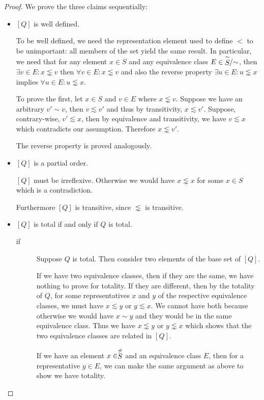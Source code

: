 \documentclass[12pt]{article}
\theoremstyle{definition}
\theoremstyle{theorem}
\begin{document}
\begin{proof}
  We prove the three claims sequentially:
  \begin{itemize}
  \item $[Q]$ is well defined.\par
    To be well defined, we need the representation element used to
    define $<$ to be unimportant: all members of the set yield the
    same result.  In particular, we need that for any element $x \in
    S$ and any equivalence class
    $E \in {\stackrel{\sim}{S}\!\!/{\mathord\sim}}$, then $\exists v\in E: x \lnsim v$
    then $\forall v \in E: x \lnsim v$ and also the reverse property
    $\exists u\in E: u \lnsim x$ implies
    $\forall u\in E: u \lnsim x$.

    To prove the first, let $x \in S$ and $v \in E$ where
    $x \lnsim v$.  Suppose we have an arbitrary $v' \sim v$, then
    $v \lesssim v'$ and thus by transitivity, $x \lesssim v'$.
    Suppose, contrary-wise, $v' \lesssim x$, then by equivalence and
    transitivity, we have $v \lesssim x$ which contradicts our
    assumption.  Therefore $x \lnsim v'$.

    The reverse property is proved analogously.
    
  \item $[Q]$ is a partial order.

    $[Q]$ must be irreflexive.  Otherwise we would have $x \lnsim x$
    for some $x \in S$ which is a contradiction.
    
    Furthermore $[Q]$ is transitive, since $\lnsim$ is transitive.

  \item $[Q]$ is total if and only if $Q$ is total.
    \begin{description}
    \item[if]  Suppose $Q$ is total.  Then consider two elements of
      the base set of $[Q]$.

      If we have two equivalence classes, then if they are the same,
      we have nothing to prove for totality.  If they are different,
      then by the totality of $Q$, for some representatives $x$ and
      $y$ of the respective equivalence classes,
      we must have $x \lesssim y$ or $y \lesssim x$.  We cannot have
      both because otherwise we would have $x \sim y$ and they would
      be in the same equivalence class.  Thus we have $x \lnsim y$ or
      $y \lnsim x$ which shows that the two equivalence classes are
      related in $[Q]$.

      If we have an element $x \in \stackrel{\not\sim}{S}$ and an equivalence
      class $E$, then for a representative $y \in E$, we can make the
      same argument as above to show we have totality.


\end{description}
\end{itemize}
\end{proof}
\end{document}
